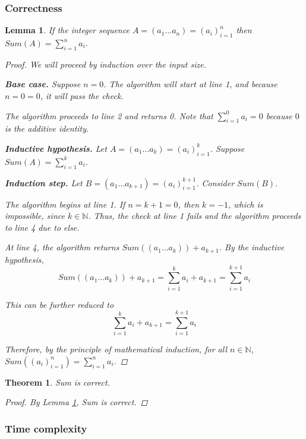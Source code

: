 \documentclass{article}
\newtheorem{theorem}{Theorem}
\newtheorem{lemma}{Lemma}
\theoremstyle{definition}
\begin{document}
\subsubsection{Correctness}

\begin{lemma}
    If the integer sequence $A = (a_1\dots a_n) = (a_i)^n_{i=1}$ then $Sum(A) = \sum^n_{i=1} a_i$.
    \label{lem:sum}
    \begin{proof}
        We will proceed by induction over the input size.

        \textbf{Base case.} Suppose $n = 0$. The algorithm will start at line 1, and because $n = 0 = 0$, it will pass the check.

        The algorithm proceeds to line 2 and returns 0. Note that $\sum^0_{i=1} a_i = 0$ because $0$ is the additive identity. 

        \textbf{Inductive hypothesis.} Let $A = (a_1\dots a_k) = (a_i)^k_{i=1}$. Suppose $Sum(A) = \sum^k_{i=1} a_i$. 

        \textbf{Induction step.} Let $B = (a_1\dots a_{k+1}) = (a_i)^{k+1}_{i=1}$. Consider $Sum(B)$.

        The algorithm begins at line 1. If $n = k+1 = 0$, then $k = -1$, which is impossible, since $k \in \mathbb{N}$. Thus, the check at line 1 fails and the algorithm proceeds to line 4 due to else.

        At line 4, the algorithm returns $Sum((a_1\dots a_{k})) + a_{k+1}$. By the inductive hypothesis, 
        $$Sum((a_1\dots a_{k})) + a_{k+1} = \sum^k_{i=1} a_i + a_{k+1} = \sum^{k+1}_{i=1} a_i$$

        This can be further reduced to 
        $$\sum^k_{i=1} a_i + a_{k+1} = \sum^{k+1}_{i=1} a_i$$

        Therefore, by the principle of mathematical induction, for all $n \in \mathbb{N}$, $Sum((a_i)^n_{i=1}) = \sum^{n}_{i=1} a_i$.
    \end{proof}
\end{lemma}

\begin{theorem}
    Sum is correct.
    \begin{proof}
        By Lemma \ref{lem:sum}, Sum is correct.
    \end{proof}
\end{theorem}

\subsubsection{Time complexity}
\end{document}
